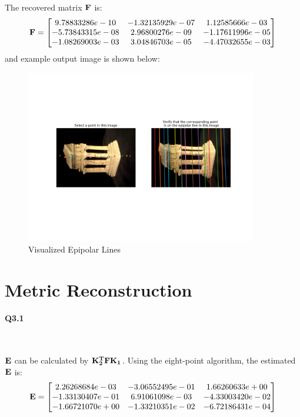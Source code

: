 \documentclass[11pt]{article} \usepackage{fullpage} \usepackage{graphicx} \usepackage{epstopdf} \usepackage{color} \usepackage{psfrag} \usepackage{pdfsync}\usepackage{indentfirst}\usepackage{subfigure}\usepackage{float}\usepackage[section]{placeins}
\begin{document}
The recovered matrix $\bold{F}$ is:
\begin{equation}
	\bold{F} = \begin{bmatrix}
	9.78833286e-10 & -1.32135929e-07 & 1.12585666e-03 \\
	-5.73843315e-08 & 2.96800276e-09 & -1.17611996e-05 \\
	-1.08269003e-03 & 3.04846703e-05 & -4.47032655e-03
	\end{bmatrix}
\end{equation}
and example output image is shown below:
\begin{figure}[H]
\centering
\includegraphics[width=0.9\textwidth]{results/q2_1.png}
\caption{Visualized Epipolar Lines}
\end{figure}

\section{Metric Reconstruction}

\paragraph{Q3.1}~{}

$\bold{E}$ can be calculated by $\bold{K_2^TFK_1}$. Using the eight-point algorithm, the estimated $\bold{E}$ is:
\begin{equation}
	\bold{E} = \begin{bmatrix}
	2.26268684e-03 & -3.06552495e-01 & 1.66260633e+00 \\
	-1.33130407e-01 & 6.91061098e-03 & -4.33003420e-02 \\
	-1.66721070e+00 & -1.33210351e-02 & -6.72186431e-04
	\end{bmatrix}
\end{equation}
\end{document}
